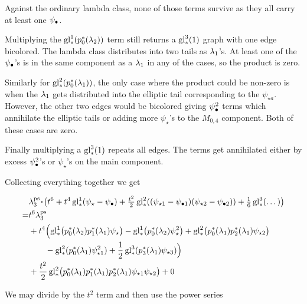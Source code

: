 \documentclass[12pt]{memoir}
\begin{document}
\begin{ptcb}
    Against the ordinary lambda class, none of those terms survive as they all carry at least one \(\psi_\bullet\).\par
    Multiplying the \(\operatorname{gl}_\ast^1(p_0^\ast(\lambda_2))\) term still returns a \(\operatorname{gl}^3_\ast(1)\) graph with one edge bicolored. The lambda class distributes into two tails as \(\lambda_1\)'s. At least one of the \(\psi_\bullet\)'s is in the same component as a \(\lambda_1\) in any of the cases, so the product is zero.\par
    Similarly for \(\operatorname{gl}_\ast^2(p_0^\ast(\lambda_1))\), the only case where the product could be non-zero is when the \(\lambda_1\) gets distributed into the elliptic tail corresponding to the \(\psi_{\star a}\). However, the other two edges would be bicolored giving \(\psi_{\bullet}^2\) terms which annihilate the elliptic tails or adding more \(\psi_{\star}\)'s to the \(M_{0,4}\) component. Both of these cases are zero.\par
    Finally multiplying a \(\operatorname{gl}_\ast^3(1)\) repeats all edges. The terms get annihilated either by excess \(\psi_{\bullet}^2\)'s or \(\psi_{\star}\)'s on the main component.
\end{ptcb}

Collecting everything together we get

\begin{align*}
      & \la_3^{\ps}\.\bigl(t^6+t^4\glu_\ast^1(\psi_\star-\psi_\8)+\tfrac{t^2}{2}\glu_\ast^2((\psi_{\star1}-\psi_{\81})(\psi_{\star2}-\psi_{\82}))+\tfrac{1}{6}\glu_\ast^3(\dots)\bigr)                  \\
    = & t^6\la_3^{\ps}                                                                                                                                                                                  \\
      & +t^4\Bigl(\glu_\ast^1\bigl(p_0^\ast(\la_2)p_1^\ast(\la_1)\psi_\star\bigr)-\glu_\ast^1\bigl(p_0^\ast(\la_2)\psi_\star^2\bigr)+\glu_\ast^2\bigl(p_0^\ast(\la_1)p_2^\ast(\la_1)\psi_{\star2}\bigr) \\
      & \qquad-\glu^2_\ast(p_0^\ast(\la_1)\psi_{\star1}^2)+\half\glu^3_\ast(p_3^\ast(\la_1)\psi_{\star3})\Bigr)                                                                                         \\
      & +\frac{t^2}{2}\glu_\ast^2\bigl(p_0^\ast(\la_1)p_1^\ast(\la_1)p_2^\ast(\la_1)\psi_{\star1}\psi_{\star2}\bigr)+0
\end{align*}

We may divide by the \(t^2\) term and then use the power series
\end{document}
